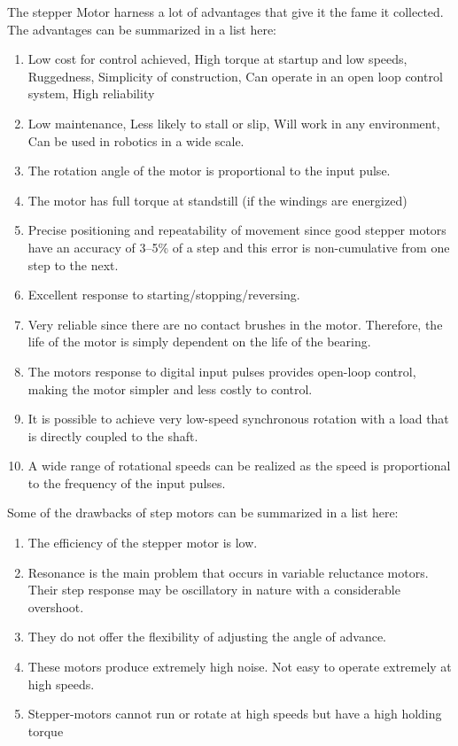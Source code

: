 \documentclass[journal]{IEEEtran}
\begin{document}
The stepper Motor harness a lot of advantages that give it the fame it collected. The advantages can be summarized in a list here:
\begin{enumerate}
    
    \item Low cost for control achieved, High torque at startup and low speeds, Ruggedness, Simplicity of construction, Can operate in an open loop control system, High reliability
    \item Low maintenance, Less likely to stall or slip, Will work in any environment, Can be used in robotics in a wide scale.
    \item The rotation angle of the motor is proportional to the input pulse.
    \item The motor has full torque at standstill (if the windings are energized)
    \item Precise positioning and repeatability of movement since good stepper motors have an accuracy of 3–5\% of a step and this error is non-cumulative from one step to the next.
    \item Excellent response to starting/stopping/reversing.
    \item Very reliable since there are no contact brushes in the motor. Therefore, the life of the motor is simply dependent on the life of the bearing.
    \item The motors response to digital input pulses provides open-loop control, making the motor simpler and less costly to control.
    \item It is possible to achieve very low-speed synchronous rotation with a load that is directly coupled to the shaft.
    \item A wide range of rotational speeds can be realized as the speed is proportional to the frequency of the input pulses.\cite{wikipedia_stepper}

\end{enumerate}


Some of the drawbacks of step motors can be summarized in a list here:
\begin{enumerate}
    \item The efficiency of the stepper motor is low.
    \item Resonance is the main problem that occurs in variable reluctance motors.\cite{website2_stepper} Their step response may be oscillatory in nature with a considerable overshoot.\cite{guru2007}
    \item They do not offer the flexibility of adjusting the angle of advance. \cite{guru2007}
    \item These motors produce extremely high noise. Not easy to operate extremely at high speeds.
    \item Stepper-motors cannot run or rotate at high speeds but have a high holding torque\cite{website2_stepper}
\end{enumerate}




	
\end{document}
